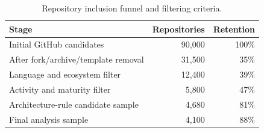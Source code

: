 \begin{table}[t]
\centering
\caption{Repository inclusion funnel and filtering criteria.}
\label{tab:funnel}
\setlength{\aboverulesep}{0pt}
\setlength{\belowrulesep}{0pt}
\renewcommand{\arraystretch}{1.25}
\begin{tabular}{lrr}
\toprule
\textbf{Stage} & \textbf{Repositories} & \textbf{Retention} \\
\midrule
\rowcolor{rowband}
Initial GitHub candidates & 90,000 & 100\% \\
After fork/archive/template removal & 31,500 & 35\% \\
\rowcolor{rowband}
Language and ecosystem filter & 12,400 & 39\% \\
Activity and maturity filter & 5,800 & 47\% \\
\rowcolor{rowband}
Architecture-rule candidate sample & 4,680 & 81\% \\
Final analysis sample & 4,100 & 88\% \\
\bottomrule
\end{tabular}
\end{table}

